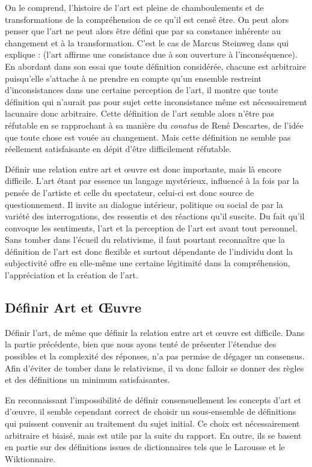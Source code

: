 \documentclass[12pt]{article} %
\begin{document}
On le comprend, l'histoire de l'art est pleine de chamboulements et de transformations de la compréhension de ce qu'il est censé être. On peut alors penser que l'art ne peut alors être défini que par sa constance inhérente au changement et à la transformation. C'est le cas de Marcus Steinweg dans  qui explique :  (l'art affirme une consistance due à son ouverture à l'inconséquence). En abordant dans son essai que toute définition considérée, chacune est arbitraire puisqu'elle s'attache à ne prendre en compte qu'un ensemble restreint d'inconsistances dans une certaine perception de l'art, il montre que toute définition qui n'aurait pas pour sujet cette inconsistance même est nécessairement lacunaire donc arbitraire. Cette définition de l'art semble alors n'être pas réfutable en se rapprochant à sa manière du \textit{conatus} de René Descartes, de l'idée que toute chose est vouée au changement. Mais cette définition ne semble pas  réellement satisfaisante en dépit d'être difficilement réfutable.

Définir une relation entre art et œuvre est donc importante, mais là encore difficile.  L'art étant par essence un langage mystérieux, influencé à la fois par la pensée de l'artiste et celle du spectateur, celui-ci est donc source de questionnement. Il invite au dialogue intérieur, politique ou social de par la variété des interrogations, des ressentis et des réactions qu'il suscite. Du fait qu'il convoque les sentiments, l'art et la perception de l'art est avant tout personnel. Sans tomber dans l'écueil du relativisme, il faut pourtant reconnaître que la définition de l'art est donc flexible et surtout dépendante de l'individu dont la subjectivité offre en elle-même une certaine légitimité dans la compréhension, l'appréciation et la création de l'art. 

\subsection{Définir Art et Œuvre}
Définir l'art, de même que définir la relation entre art et œuvre est difficile. Dans la partie précédente, bien que nous ayons tenté de présenter l'étendue des possibles et la complexité des réponses, n'a pas permise de dégager un consensus. Afin d'éviter de tomber dans le relativisme, il va donc falloir se donner des règles et des définitions un minimum satisfaisantes. 

En reconnaissant l'impossibilité de définir consensuellement les concepts d'art et d'œuvre, il semble cependant correct de choisir un sous-ensemble de définitions qui puissent convenir au traitement du sujet initial. Ce choix est nécessairement arbitraire et biaisé, mais est utile par la suite du rapport. En outre, ils se basent en partie sur des définitions issues de dictionnaires tels que le Larousse et le Wiktionnaire.
\end{document}
